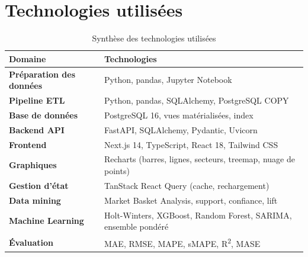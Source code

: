 \documentclass[12pt,a4paper,twoside]{report}
\begin{document}
\section{Technologies utilisées}

\begin{table}[H]
\centering
{}
\begin{tabularx}{\textwidth}{>{\bfseries}p{4cm}X}
\toprule
\rowcolor{TableHeader}
\color{white}Domaine & \color{white}Technologies \\
\midrule
Préparation des données & Python, pandas, Jupyter Notebook \\
Pipeline ETL & Python, pandas, SQLAlchemy, PostgreSQL COPY \\
Base de données & PostgreSQL 16, vues matérialisées, index \\
Backend API & FastAPI, SQLAlchemy, Pydantic, Uvicorn \\
Frontend & Next.js 14, TypeScript, React 18, Tailwind CSS \\
Graphiques & Recharts (barres, lignes, secteurs, treemap, nuage de points) \\
Gestion d'état & TanStack React Query (cache, rechargement) \\
Data mining & Market Basket Analysis, support, confiance, lift \\
Machine Learning & Holt-Winters, XGBoost, Random Forest, SARIMA, ensemble pondéré \\
Évaluation & MAE, RMSE, MAPE, sMAPE, R\textsuperscript{2}, MASE \\
\bottomrule
\end{tabularx}
\caption{Synthèse des technologies utilisées}
\label{tab:technologies}
\end{table}

\printbibliography
\end{document}
